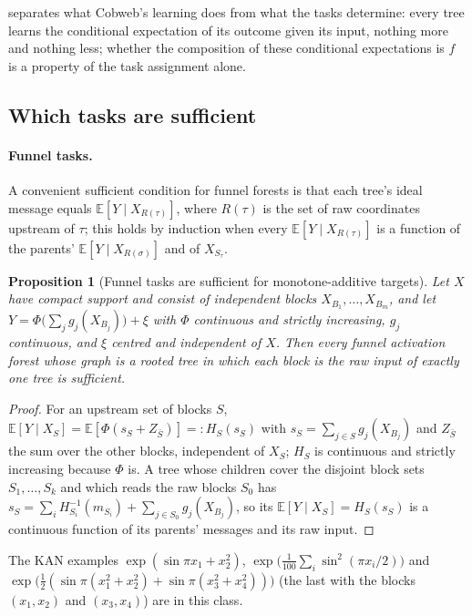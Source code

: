 \documentclass[11pt]{article}
\newtheorem{proposition}[theorem]{Proposition}
\theoremstyle{definition}
\theoremstyle{remark}
\newcommand{\E}{\mathbb{E}}
\begin{document}
 separates what Cobweb's learning does from what the tasks determine:
every tree learns the conditional expectation of its outcome given its input, nothing more
and nothing less; whether the composition of these conditional expectations is $f$ is a
property of the task assignment alone.

\subsection{Which tasks are sufficient}

\paragraph{Funnel tasks.}
A convenient sufficient condition for funnel forests is that each tree's ideal message
equals $\E[Y\mid X_{R(\tau)}]$, where $R(\tau)$ is the set of raw coordinates upstream of
$\tau$; this holds by induction when every $\E[Y\mid X_{R(\tau)}]$ is a function of the
parents' $\E[Y\mid X_{R(\sigma)}]$ and of $X_{S_\tau}$.

\begin{proposition}[Funnel tasks are sufficient for monotone-additive targets]\label{prop:suffclass}
Let $X$ have compact support and consist of independent blocks $X_{B_1},\dots,X_{B_m}$, and let
$Y=\Phi\bigl(\sum_jg_j(X_{B_j})\bigr)+\xi$ with $\Phi$ continuous and strictly increasing,
$g_j$ continuous, and $\xi$ centred and independent of $X$.  Then every funnel
activation forest whose graph is a rooted tree in which each block is the raw input of
exactly one tree is sufficient.
\end{proposition}
\begin{proof}
For an upstream set of blocks $S$, $\E[Y\mid X_S]=\E[\Phi(s_S+Z_{\bar S})]=:H_S(s_S)$ with
$s_S=\sum_{j\in S}g_j(X_{B_j})$ and $Z_{\bar S}$ the sum over the other blocks, independent
of $X_S$; $H_S$ is continuous and strictly increasing because $\Phi$ is.  A tree whose
children cover the disjoint block sets $S_1,\dots,S_k$ and which reads the raw blocks $S_0$
has $s_S=\sum_iH_{S_i}^{-1}(m_{S_i})+\sum_{j\in S_0}g_j(X_{B_j})$, so its
$\E[Y\mid X_S]=H_S(s_S)$ is a continuous function of its parents' messages and its raw
input.
\end{proof}

The KAN examples $\exp(\sin\pi x_1+x_2^2)$, $\exp\bigl(\tfrac1{100}\sum_i\sin^2(\pi x_i/2)\bigr)$
and $\exp\bigl(\tfrac12(\sin\pi(x_1^2+x_2^2)+\sin\pi(x_3^2+x_4^2))\bigr)$ (the last with
the blocks $(x_1,x_2)$ and $(x_3,x_4)$) are in this class.
\end{document}
